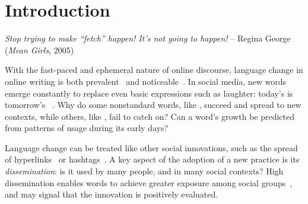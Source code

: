 \section{Introduction}

\textit{Stop trying to make ``fetch'' happen! It's not going to happen!} -- Regina George (\emph{Mean Girls}, 2005) \vspace{8pt}

With the fast-paced and ephemeral nature of online discourse, language change in online writing is both prevalent~\cite{androutsopoulos2011} and noticeable~\cite{squires2010enregistering}. 
In social media, new words emerge constantly to replace even basic expressions such as laughter: today's  is tomorrow's ~\cite{tagliamonte2008}. 
Why do some nonstandard words, like , succeed and spread to new contexts, while others, like , fail to catch on? 
Can a word's growth be predicted from patterns of usage during its early days?

Language change
can be treated like other social innovations, such as the spread of hyperlinks~\cite{bakshy2011everyone} or hashtags~\cite{romero2011differences,tsur2015}.
A key aspect of the adoption of a new practice is its \emph{dissemination}: is it used by many people, and in many social contexts?
High dissemination enables words to achieve greater exposure among social groups~\cite{altmann2011}, and may signal that the innovation is positively evaluated.

